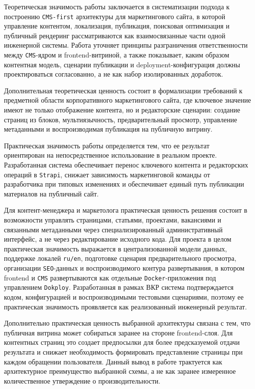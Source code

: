 
Теоретическая значимость работы заключается в систематизации подхода к построению
\texttt{CMS-first} архитектуры для маркетингового сайта, в которой управление контентом,
локализация, публикация, поисковая оптимизация и публичный рендеринг рассматриваются как
взаимосвязанные части одной инженерной системы. Работа уточняет принципы разграничения
ответственности между \texttt{CMS}-ядром и frontend-витриной, а также показывает, каким
образом контентная модель, сценарии публикации и deployment-конфигурация должны
проектироваться согласованно, а не как набор изолированных доработок.

Дополнительная теоретическая ценность состоит в формализации требований к предметной
области корпоративного маркетингового сайта, где ключевое значение имеют не только
отображение контента, но и редакторские сценарии: создание страниц из блоков,
мультиязычность, предварительный просмотр, управление метаданными и воспроизводимая
публикация на публичную витрину.


Практическая значимость работы определяется тем, что ее результат ориентирован на
непосредственное использование в реальном проекте. Разработанная система обеспечивает
перенос ключевого контента и редакторских операций в \texttt{Strapi}, снижает
зависимость маркетинговой команды от разработчика при типовых изменениях и обеспечивает
единый путь публикации материалов на публичный сайт.

Для контент-менеджера и маркетолога практическая ценность решения состоит в возможности
управлять страницами, статьями, проектами, вакансиями и связанными метаданными через
специализированный административный интерфейс, а не через редактирование исходного кода.
Для проекта в целом практическая значимость выражается в централизованной модели данных,
поддержке локалей \texttt{ru/en}, подготовке сценария предварительного просмотра,
организации \texttt{SEO}-данных и воспроизводимого контура развертывания, в котором
frontend и \texttt{CMS} развертываются как отдельные \texttt{Docker}-приложения под
управлением \texttt{Dokploy}. Разработанная в рамках ВКР система подтверждается кодом, конфигурацией и
воспроизводимыми тестовыми сценариями, поэтому ее практическая значимость проявляется как
реализованный инженерный результат.

Дополнительно практическая ценность выбранной архитектуры связана с тем, что публичная
витрина может собираться заранее на стороне frontend-слоя. Для контентных страниц это
создает предпосылки для более предсказуемой отдачи результата и снижает необходимость
формировать представление страницы при каждом обращении пользователя. Данный вывод в
работе трактуется как архитектурное преимущество выбранной схемы, а не как заранее
измеренное количественное утверждение о производительности.

